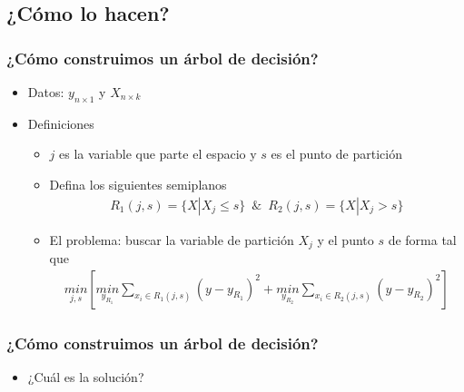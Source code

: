 \documentclass[
  shownotes,
  xcolor={svgnames},
  hyperref={colorlinks,citecolor=DarkBlue,linkcolor=andesred,urlcolor=DarkBlue}
  , aspectratio=169]{beamer}
\begin{document}
\subsection{¿Cómo lo hacen?}

\begin{frame}[fragile]
\frametitle{¿Cómo construimos un árbol de decisión?}


\begin{itemize}
\item Datos: $y_{n\times 1}$  y $X_{n\times k}$ 
\medskip
\item Definiciones
\medskip
\begin{itemize}
\item $j$ es la variable que parte el espacio y  $s$ es el punto de partición
\medskip
\item Defina los siguientes semiplanos
\begin{align}
R_1(j,s)=\{X|X_j\leq s\} \,\,\, \& \,\,\, R_2(j,s)=\{X|X_j > s\}
\end{align}
\item El problema: buscar la variable de partición $X_j$ y el punto $s$ de forma tal que 
\begin{align}
\underset{j,s}{min} \left[ \underset{y_{R_1}}{min}\sum_{x_i\in R_1(j,s)}(y-y_{R_1})^2+ \underset{y_{R_2}}{min}\sum_{x_i\in R_2(j,s)}(y-y_{R_2})^2\right]
\end{align}
\end{itemize}
\end{itemize}
\end{frame}
\begin{frame}[t]
\frametitle{¿Cómo construimos un árbol de decisión?}

  \begin{itemize}
\item ¿Cuál es la solución?

\end{itemize}
\end{frame}
\end{document}
